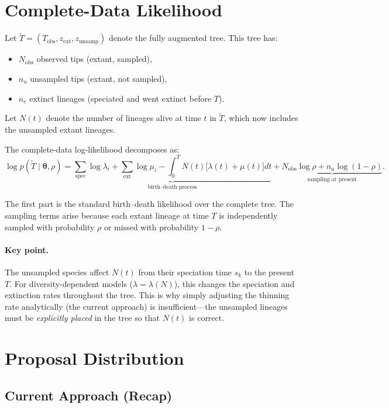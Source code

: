 \documentclass[11pt]{article}
\newcommand{\btheta}{\boldsymbol{\theta}}
\newcommand{\Tobs}{T_{\mathrm{obs}}}
\newcommand{\Nobs}{N_{\mathrm{obs}}}
\begin{document}
\section{Complete-Data Likelihood}

Let $\tilde{T} = (\Tobs, z_{\mathrm{ext}}, z_{\mathrm{unsamp}})$ denote the fully augmented tree. This tree has:
\begin{itemize}
\item $\Nobs$ observed tips (extant, sampled),
\item $n_u$ unsampled tips (extant, not sampled),
\item $n_e$ extinct lineages (speciated and went extinct before $T$).
\end{itemize}
Let $N(t)$ denote the number of lineages alive at time $t$ in $\tilde{T}$, which now includes the unsampled extant lineages.

The complete-data log-likelihood decomposes as:
\begin{equation}\label{eq:loglik}
\log p(\tilde{T} \mid \btheta, \rho) = \underbrace{\sum_{\text{spec}} \log \lambda_i + \sum_{\text{ext}} \log \mu_i - \int_0^T N(t)\bigl[\lambda(t) + \mu(t)\bigr] dt}_{\text{birth--death process}} + \underbrace{\Nobs \log \rho + n_u \log(1 - \rho)}_{\text{sampling at present}}.
\end{equation}

The first part is the standard birth--death likelihood over the complete tree. The sampling terms arise because each extant lineage at time $T$ is independently sampled with probability $\rho$ or missed with probability $1 - \rho$.

\paragraph{Key point.} The unsampled species affect $N(t)$ from their speciation time $s_k$ to the present $T$. For diversity-dependent models ($\lambda = \lambda(N)$), this changes the speciation and extinction rates throughout the tree. This is why simply adjusting the thinning rate analytically (the current approach) is insufficient---the unsampled lineages must be \emph{explicitly placed} in the tree so that $N(t)$ is correct.

\section{Proposal Distribution}

\subsection{Current Approach (Recap)}
\end{document}
